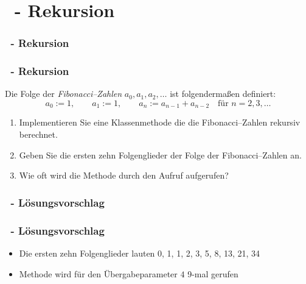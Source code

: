 \def\stitle{\theexercise\ - Rekursion}
\section{\stitle}
\begin{frame}
  \frametitle{\stitle}%
\tableofcontents[current]
\end{frame}


\begin{frame}%
  \frametitle{\stitle}%

Die Folge der \emph{Fibonacci--Zahlen} $a_0, a_1, a_2, \dotsc$ ist folgendermaßen definiert:
\begin{equation*}
a_0 := 1,\qquad
a_1 := 1,\qquad
a_n := a_{n-1} + a_{n-2}\quad\text{f\"ur } n = 2,3,\dotsc
\end{equation*}

\begin{enumerate}
\item Implementieren Sie eine Klassenmethode die die Fibonacci--Zahlen rekursiv berechnet.
\item Geben Sie die ersten zehn Folgenglieder der Folge der Fibonacci--Zahlen an.
\item Wie oft wird die Methode durch den Aufruf  aufgerufen?
\end{enumerate}
\end{frame}


\begin{frame}%
  \frametitle{\theexercise\ - L\"osungsvorschlag}%

\end{frame}

\begin{frame}%
  \frametitle{\theexercise\ - L\"osungsvorschlag}%
\begin{itemize}
\item Die ersten zehn Folgenglieder lauten 0, 1, 1, 2, 3, 5, 8, 13, 21, 34
\item Methode  wird für den Übergabeparameter $4$ 9-mal gerufen
\end{itemize}
\end{frame}